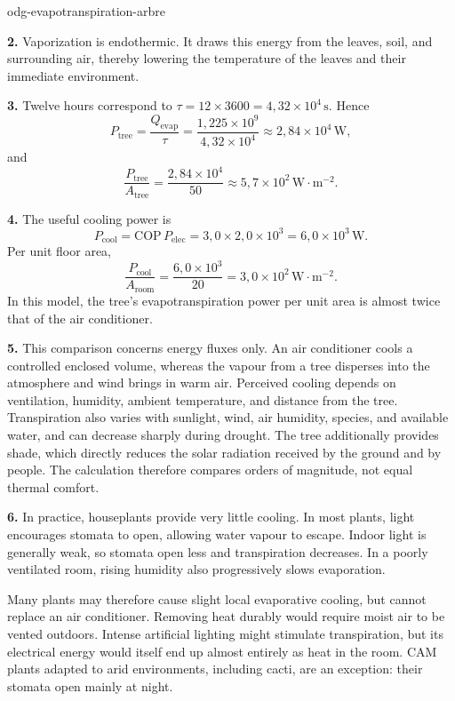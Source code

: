 \begin{exo}{odg-evapotranspiration-arbre}
\begin{solution}
\textbf{2.} Vaporization is endothermic. It draws this energy from the leaves, soil, and surrounding air, thereby lowering the temperature of the leaves and their immediate environment.

\textbf{3.} Twelve hours correspond to $\tau=12\times3600=4{,}32\times10^4\,\text{s}$. Hence
\[
P_{\text{tree}}=\frac{Q_{\mathrm{evap}}}{\tau}
=\frac{1{,}225\times10^9}{4{,}32\times10^4}
\approx2{,}84\times10^4\,\text{W},
\]
and
\[
\frac{P_{\text{tree}}}{A_{\text{tree}}}
=\frac{2{,}84\times10^4}{50}
\approx5{,}7\times10^2\,\text{W}\!\cdot\!\text{m}^{-2}.
\]

\textbf{4.} The useful cooling power is
\[
P_{\text{cool}}=\mathrm{COP}\,P_{\mathrm{elec}}
=3{,}0\times2{,}0\times10^3
=6{,}0\times10^3\,\text{W}.
\]
Per unit floor area,
\[
\frac{P_{\text{cool}}}{A_{\text{room}}}
=\frac{6{,}0\times10^3}{20}
=3{,}0\times10^2\,\text{W}\!\cdot\!\text{m}^{-2}.
\]
In this model, the tree's evapotranspiration power per unit area is almost twice that of the air conditioner.

\textbf{5.} This comparison concerns energy fluxes only. An air conditioner cools a controlled enclosed volume, whereas the vapour from a tree disperses into the atmosphere and wind brings in warm air. Perceived cooling depends on ventilation, humidity, ambient temperature, and distance from the tree. Transpiration also varies with sunlight, wind, air humidity, species, and available water, and can decrease sharply during drought. The tree additionally provides shade, which directly reduces the solar radiation received by the ground and by people. The calculation therefore compares orders of magnitude, not equal thermal comfort.

\textbf{6.} In practice, houseplants provide very little cooling. In most plants, light encourages stomata to open, allowing water vapour to escape. Indoor light is generally weak, so stomata open less and transpiration decreases. In a poorly ventilated room, rising humidity also progressively slows evaporation.

Many plants may therefore cause slight local evaporative cooling, but cannot replace an air conditioner. Removing heat durably would require moist air to be vented outdoors. Intense artificial lighting might stimulate transpiration, but its electrical energy would itself end up almost entirely as heat in the room. CAM plants adapted to arid environments, including cacti, are an exception: their stomata open mainly at night.
\end{solution}
\end{exo}

